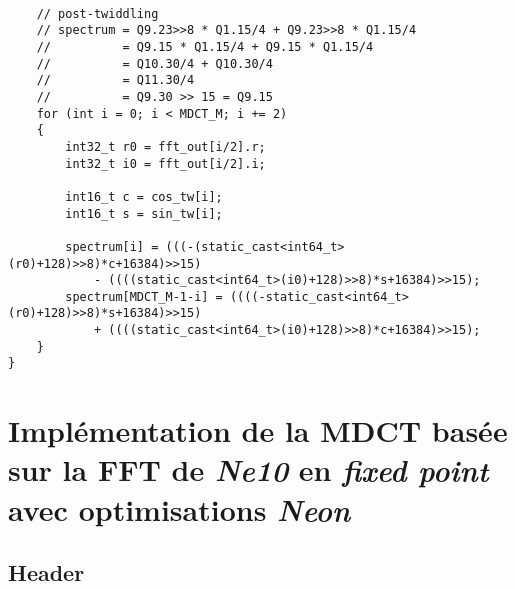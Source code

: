 \documentclass{article}
\begin{document}
\begin{lstlisting}

    // post-twiddling
    // spectrum = Q9.23>>8 * Q1.15/4 + Q9.23>>8 * Q1.15/4
    //          = Q9.15 * Q1.15/4 + Q9.15 * Q1.15/4
    //          = Q10.30/4 + Q10.30/4
    //          = Q11.30/4
    //          = Q9.30 >> 15 = Q9.15
    for (int i = 0; i < MDCT_M; i += 2)
    {
        int32_t r0 = fft_out[i/2].r;
        int32_t i0 = fft_out[i/2].i;

        int16_t c = cos_tw[i];
        int16_t s = sin_tw[i];

        spectrum[i] = (((-(static_cast<int64_t>(r0)+128)>>8)*c+16384)>>15) 
            - ((((static_cast<int64_t>(i0)+128)>>8)*s+16384)>>15);
        spectrum[MDCT_M-1-i] = ((((-static_cast<int64_t>(r0)+128)>>8)*s+16384)>>15) 
            + ((((static_cast<int64_t>(i0)+128)>>8)*c+16384)>>15);
    }
}
\end{lstlisting}




\newpage
\section{Implémentation de la MDCT basée sur la FFT de \emph{Ne10} en \emph{fixed point} avec optimisations \emph{Neon}}\label{app:mdct_ne10_i32_neon}
\subsection{Header}\label{app:mdct_ne10_i32_neon_header}
\end{document}

